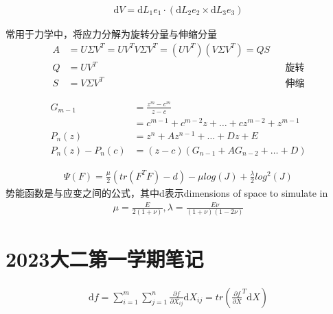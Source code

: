 \begin{thm}[给定三个向量形成三维图形的体积]
		\begin{align*}
				\mathrm{d}V = \mathrm{d}L_1e_1\cdot (\mathrm{d}L_2e_2\times \mathrm{d}L_3e_3)  
		\end{align*}
\end{thm}
\begin{thm}[极分解]
常用于力学中，将应力分解为旋转分量与伸缩分量
\begin{align*}
		A &= U \Sigma V^T = UV^TV\Sigma V^T = (UV^T)(V\Sigma V^T) = QS\\
		Q &= UV^T  &&\text{旋转} \\
		S &= V\Sigma V^T &&\text{伸缩} 
\end{align*}
\end{thm}

\begin{thm}[代数基本定理的证明]
		\begin{align*}
				G_{m-1}&= \frac{z^m - c^m}{z-c} \\
					   &=c^{m-1}+c^{m-2}z+\ldots+cz^{m-2}+z^{m-1}  \\
				P_n(z) &= z^n + Az^{n-1} + \ldots+Dz + E\\
				P_n(z) - P_n(c) &= (z-c)(G_{n-1}+AG_{n-2}+\ldots+D)
		\end{align*}
\end{thm}
\begin{thm}
		\begin{align*}
		\Psi(F) = \frac{\mu}{2} (tr(F^TF)-d)  - \mu log(J) + \frac{\lambda}{2}  log^2(J)
		\end{align*}
		势能函数是与应变之间的公式，其中d表示dimensions of space to simulate in 
\begin{align*}
		\mu  = \frac{E}{2(1+\nu )} , \lambda = \frac{E\nu }{(1+\nu )(1-2\nu )} 
\end{align*}
\end{thm}
\section{2023大二第一学期笔记}
\begin{thm}[矩阵内积以表示矩阵微分]
		\begin{align*}
				\mathrm{d}f = \sum_{i=1}^{m} \sum_{j=1}^{n} \frac{\partial f}{\partial X_{ij}} \mathrm{d}X_{ij}=tr(\frac{\partial f}{\partial X} ^T \mathrm{d}X)
		\end{align*}
\end{thm}

